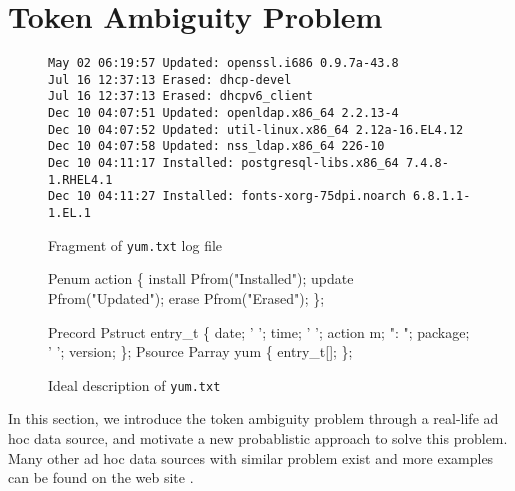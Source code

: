 \section{Token Ambiguity Problem} \label{sec:examples}
\begin{figure}[t]
\begin{center}
{\small
\begin{verbatim}
May 02 06:19:57 Updated: openssl.i686 0.9.7a-43.8
Jul 16 12:37:13 Erased: dhcp-devel
Jul 16 12:37:13 Erased: dhcpv6_client
Dec 10 04:07:51 Updated: openldap.x86_64 2.2.13-4
Dec 10 04:07:52 Updated: util-linux.x86_64 2.12a-16.EL4.12
Dec 10 04:07:58 Updated: nss_ldap.x86_64 226-10
Dec 10 04:11:17 Installed: postgresql-libs.x86_64 7.4.8-1.RHEL4.1
Dec 10 04:11:27 Installed: fonts-xorg-75dpi.noarch 6.8.1.1-1.EL.1
\end{verbatim}
}
\end{center}
\caption{Fragment of {\tt yum.txt} log file} \label{fig:yum}
\end{figure}

\begin{figure}[t]
\begin{minipage}[t]{0.5\columnwidth}
\begin{code}
Penum action \{
  install Pfrom("Installed");
  update Pfrom("Updated");
  erase Pfrom("Erased");
\};
\end{code}
\end{minipage}
\hfill
\begin{minipage}[t]{0.5\columnwidth}
\begin{code}
Precord Pstruct entry_t \{
         date;	
  ' ';   time;	
  ' ';  action m; 	
  ": ";  package;	
  ' ';   version;
\};
Psource Parray yum \{
        entry_t[];
\};
\end{code}
\end{minipage}
\caption{Ideal \pads{} description of {\tt yum.txt}}\label{fig:yum-gold}
\end{figure}


In this section, we introduce the token ambiguity problem through
a real-life ad hoc data source, and motivate a new probablistic approach
to solve this problem. Many other ad hoc data sources with similar
problem exist and more examples can be found on the \pads{} web site \cite{padsweb}.

